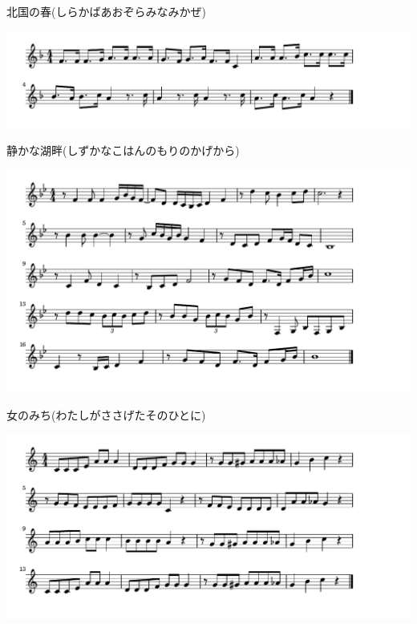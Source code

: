 \documentclass[a4paper]{ltjsarticle}
\begin{document}
\vspace{-10mm} \hspace{10mm}
北国の春(しらかばあおぞらみなみかぜ)

\includegraphics[clip]{shizukanakohan_crop.pdf}

\vspace{-10mm} \hspace{10mm}
静かな湖畔(しずかなこはんのもりのかげから)

\includegraphics[clip]{onnanomichi_crop.pdf}

\vspace{-10mm} \hspace{10mm}
女のみち(わたしがささげたそのひとに)


\includegraphics[clip]{omochanochachacha_crop.pdf}
\end{document}
